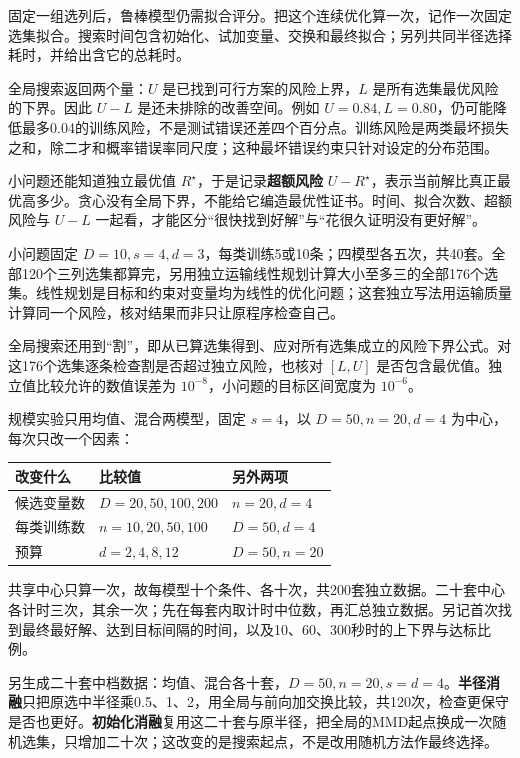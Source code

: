 \documentclass[11pt,a4paper]{article}
\newcommand{\topic}[1]{\par\vspace{8pt}{\large\bfseries\color{ink}#1}\par\vspace{2pt}}
\begin{document}
固定一组选列后，鲁棒模型仍需拟合评分。把这个连续优化算一次，记作一次固定选集拟合。搜索时间包含初始化、试加变量、交换和最终拟合；另列共同半径选择耗时，并给出含它的总耗时。

全局搜索返回两个量：$U$ 是已找到可行方案的风险上界，$L$ 是所有选集最优风险的下界。因此 $U-L$ 是还未排除的改善空间。例如 $U=0.84,L=0.80$，仍可能降低最多0.04的训练风险，不是测试错误还差四个百分点。训练风险是两类最坏损失之和，除二才和概率错误率同尺度；这种最坏错误约束只针对设定的分布范围。

小问题还能知道独立最优值 $R^\star$，于是记录\textbf{超额风险} $U-R^\star$，表示当前解比真正最优高多少。贪心没有全局下界，不能给它编造最优性证书。时间、拟合次数、超额风险与 $U-L$ 一起看，才能区分“很快找到好解”与“花很久证明没有更好解”。
\topic{小问题核查与单因素规模比较}

小问题固定 $D=10,s=4,d=3$，每类训练5或10条；四模型各五次，共40套。全部120个三列选集都算完，另用独立运输线性规划计算大小至多三的全部176个选集。线性规划是目标和约束对变量均为线性的优化问题；这套独立写法用运输质量计算同一个风险，核对结果而非只让原程序检查自己。

全局搜索还用到“割”，即从已算选集得到、应对所有选集成立的风险下界公式。对这176个选集逐条检查割是否超过独立风险，也核对 $[L,U]$ 是否包含最优值。独立值比较允许的数值误差为 $10^{-8}$，小问题的目标区间宽度为 $10^{-6}$。

规模实验只用均值、混合两模型，固定 $s=4$，以 $D=50,n=20,d=4$ 为中心，每次只改一个因素：

\begin{center}
\begin{tabular}{@{}lll@{}}\toprule
改变什么 & 比较值 & 另外两项\\\midrule
候选变量数 & $D=20,50,100,200$ & $n=20,d=4$\\
每类训练数 & $n=10,20,50,100$ & $D=50,d=4$\\
预算 & $d=2,4,8,12$ & $D=50,n=20$\\\bottomrule
\end{tabular}
\end{center}
共享中心只算一次，故每模型十个条件、各十次，共200套独立数据。二十套中心各计时三次，其余一次；先在每套内取计时中位数，再汇总独立数据。另记首次找到最终最好解、达到目标间隔的时间，以及10、60、300秒时的上下界与达标比例。
\topic{只做两项小消融}

另生成二十套中档数据：均值、混合各十套，$D=50,n=20,s=d=4$。\textbf{半径消融}只把原选中半径乘0.5、1、2，用全局与前向加交换比较，共120次，检查更保守是否也更好。\textbf{初始化消融}复用这二十套与原半径，把全局的MMD起点换成一次随机选集，只增加二十次；这改变的是搜索起点，不是改用随机方法作最终选择。
\end{document}
